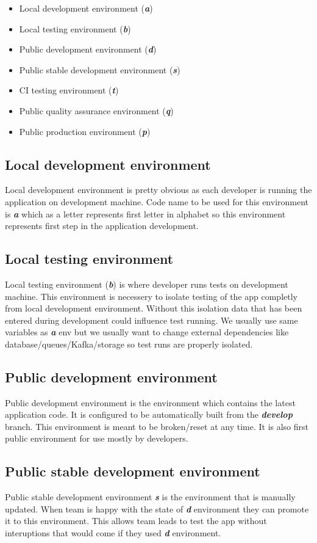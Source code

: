 \documentclass[lang=en,color=green]{elegantbook}
\newcommand{\bi}[1]{\textit{\textbf{#1}}}
\begin{document}
\begin{itemize}
    \item Local development environment (\bi{a})
    \item Local testing environment (\bi{b})
    \item Public development environment (\bi{d})
    \item Public stable development environment (\bi{s})
    \item CI testing environment (\bi{t})
    \item Public quality assurance environment (\bi{q})
    \item Public production environment (\bi{p})
\end{itemize}

\subsection{Local development environment}
Local development environment is pretty obvious as each developer
is running the application on development machine.
Code name to be used for this environment is \bi{a} which as a letter
represents first letter in alphabet so this environment represents
first step in the application development.

\subsection{Local testing environment}
Local testing environment (\bi{b}) is where developer runs tests on development
machine. This environment is necessery to isolate testing of the app
completly from local development environment. Without this isolation
data that has been entered during development could influence
test running. We usually use same variables
as \bi{a} env but we usually want to change external dependencies
like database/queues/Kafka/storage so test runs are properly isolated.

\subsection{Public development environment}
Public development environment is the environment which contains the
latest application code. It is configured to be automatically built
from the \bi{develop} branch. This environment is meant to be
broken/reset at any time. It is also first public environment for use
mostly by developers.

\subsection{Public stable development environment}
Public stable development environment \bi{s} is the environment that is
manually updated. When team is happy with the state of \bi{d} environment
they can promote it to this environment. This allows team leads
to test the app without interuptions that would come if they used \bi{d}
environment.
\end{document}
